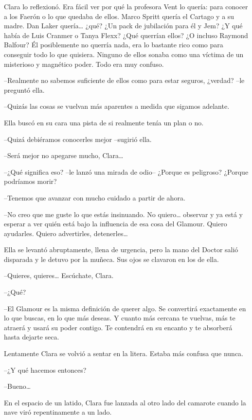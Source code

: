 {Clara lo reflexionó. Era fácil ver por qué la profesora Vent lo quería:
 para conocer a los Faerón o lo que quedaba de ellos. Marco Spritt quería
 el Cartago y a su madre. Dan Laker quería\ldots{} ¿qué? ¿Un pack de
 jubilación para él y Jem? ¿Y qué había de Luis Cranmer o Tanya Flexx?
 ¿Qué querrían ellos? ¿O incluso Raymond Balfour? Él posiblemente no
 querría nada, era lo bastante rico como para conseguir todo lo que
 quisiera. Ninguno de ellos sonaba como una víctima de un misterioso y
magnético poder. Todo era muy confuso.}

{--Realmente no sabemos suficiente de ellos como para estar seguros,
¿verdad? --le preguntó ella.}

{--Quizás las cosas se vuelvan más aparentes a medida que sigamos
adelante.}

{Ella buscó en su cara una pista de si realmente tenía un plan o no.}

{--Quizá debiéramos conocerles mejor --sugirió ella.}

{--Será mejor no apegarse mucho, Clara\ldots{}}

{--¿Qué significa eso? --le lanzó una mirada de odio-- ¿Porque es
peligroso? ¿Porque podríamos morir?}

{--Tenemos que avanzar con mucho cuidado a partir de ahora.}

{--No creo que me guste lo que estás insinuando. No quiero\ldots{}
 observar y ya está y esperar a ver quién está bajo la influencia de esa
 cosa del Glamour. Quiero ayudarles. Quiero advertirles,
 detenerles\ldots{}}

{Ella se levantó abruptamente, llena de urgencia, pero la mano del Doctor
 salió disparada y le detuvo por la muñeca. Sus ojos se clavaron en los
de ella.}

{--Quieres, quieres\ldots{} Escúchate, Clara.}

{--¿Qué?}

{--El Glamour es la misma definición de querer algo. Se convertirá
 exactamente en lo que buscas, en lo que más deseas. Y cuanto más cercana
 te vuelvas, más te atraerá y usará su poder contigo. Te contendrá en su
encanto y te absorberá hasta dejarte seca.}

{Lentamente Clara se volvió a sentar en la litera. Estaba más confusa que
nunca.}

{--¿Y qué hacemos entonces?}

{--Bueno\ldots{}}

{En el espacio de un latido, Clara fue lanzada al otro lado del camarote
cuando la nave viró repentinamente a un lado.}

